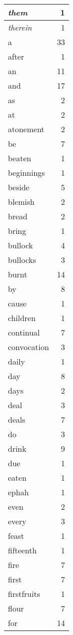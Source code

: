 \begin{center}
\begin{longtable}{l|r}
\emph{them} & 1\\ \hline 
\emph{therein} & 1\\ \hline 
a & 33\\ \hline 
after & 1\\ \hline 
an & 11\\ \hline 
and & 17\\ \hline 
as & 2\\ \hline 
at & 2\\ \hline 
atonement & 2\\ \hline 
be & 7\\ \hline 
beaten & 1\\ \hline 
beginnings & 1\\ \hline 
beside & 5\\ \hline 
blemish & 2\\ \hline 
bread & 2\\ \hline 
bring & 1\\ \hline 
bullock & 4\\ \hline 
bullocks & 3\\ \hline 
burnt & 14\\ \hline 
by & 8\\ \hline 
cause & 1\\ \hline 
children & 1\\ \hline 
continual & 7\\ \hline 
convocation & 3\\ \hline 
daily & 1\\ \hline 
day & 8\\ \hline 
days & 2\\ \hline 
deal & 3\\ \hline 
deals & 7\\ \hline 
do & 3\\ \hline 
drink & 9\\ \hline 
due & 1\\ \hline 
eaten & 1\\ \hline 
ephah & 1\\ \hline 
even & 2\\ \hline 
every & 3\\ \hline 
feast & 1\\ \hline 
fifteenth & 1\\ \hline 
fire & 7\\ \hline 
first & 7\\ \hline 
firstfruits & 1\\ \hline 
flour & 7\\ \hline 
for & 14\\ \hline 

\end{longtable}
\end{center}
